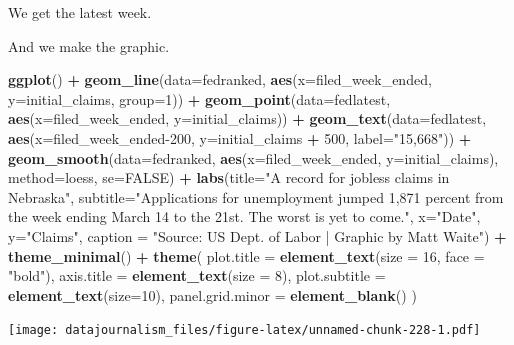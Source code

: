 \documentclass[]{book}
\newenvironment{Shaded}{\begin{snugshade}}{\end{snugshade}}
\newcommand{\DataTypeTok}[1]{\textcolor[rgb]{0.13,0.29,0.53}{#1}}
\newcommand{\DecValTok}[1]{\textcolor[rgb]{0.00,0.00,0.81}{#1}}
\newcommand{\KeywordTok}[1]{\textcolor[rgb]{0.13,0.29,0.53}{\textbf{#1}}}
\newcommand{\NormalTok}[1]{#1}
\newcommand{\OperatorTok}[1]{\textcolor[rgb]{0.81,0.36,0.00}{\textbf{#1}}}
\newcommand{\OtherTok}[1]{\textcolor[rgb]{0.56,0.35,0.01}{#1}}
\newcommand{\StringTok}[1]{\textcolor[rgb]{0.31,0.60,0.02}{#1}}
\begin{document}
We get the latest week.

\begin{Shaded}
\end{Shaded}

And we make the graphic.

\begin{Shaded}
\begin{Highlighting}[]
\KeywordTok{ggplot}\NormalTok{() }\OperatorTok{+}\StringTok{ }
\StringTok{  }\KeywordTok{geom_line}\NormalTok{(}\DataTypeTok{data=}\NormalTok{fedranked, }\KeywordTok{aes}\NormalTok{(}\DataTypeTok{x=}\NormalTok{filed_week_ended, }\DataTypeTok{y=}\NormalTok{initial_claims, }\DataTypeTok{group=}\DecValTok{1}\NormalTok{)) }\OperatorTok{+}
\StringTok{  }\KeywordTok{geom_point}\NormalTok{(}\DataTypeTok{data=}\NormalTok{fedlatest, }\KeywordTok{aes}\NormalTok{(}\DataTypeTok{x=}\NormalTok{filed_week_ended, }\DataTypeTok{y=}\NormalTok{initial_claims)) }\OperatorTok{+}\StringTok{ }
\StringTok{  }\KeywordTok{geom_text}\NormalTok{(}\DataTypeTok{data=}\NormalTok{fedlatest, }\KeywordTok{aes}\NormalTok{(}\DataTypeTok{x=}\NormalTok{filed_week_ended}\DecValTok{-200}\NormalTok{, }\DataTypeTok{y=}\NormalTok{initial_claims }\OperatorTok{+}\StringTok{ }\DecValTok{500}\NormalTok{, }\DataTypeTok{label=}\StringTok{"15,668"}\NormalTok{)) }\OperatorTok{+}\StringTok{ }
\StringTok{  }\KeywordTok{geom_smooth}\NormalTok{(}\DataTypeTok{data=}\NormalTok{fedranked, }\KeywordTok{aes}\NormalTok{(}\DataTypeTok{x=}\NormalTok{filed_week_ended, }\DataTypeTok{y=}\NormalTok{initial_claims), }\DataTypeTok{method=}\NormalTok{loess, }\DataTypeTok{se=}\OtherTok{FALSE}\NormalTok{) }\OperatorTok{+}\StringTok{ }
\StringTok{  }\KeywordTok{labs}\NormalTok{(}\DataTypeTok{title=}\StringTok{"A record for jobless claims in Nebraska"}\NormalTok{, }\DataTypeTok{subtitle=}\StringTok{"Applications for unemployment jumped 1,871 percent from the week ending March 14 to the 21st. The worst is yet to come."}\NormalTok{, }\DataTypeTok{x=}\StringTok{"Date"}\NormalTok{, }\DataTypeTok{y=}\StringTok{"Claims"}\NormalTok{, }\DataTypeTok{caption =} \StringTok{"Source: US Dept. of Labor  |  Graphic by Matt Waite"}\NormalTok{) }\OperatorTok{+}
\StringTok{  }\KeywordTok{theme_minimal}\NormalTok{() }\OperatorTok{+}\StringTok{ }
\StringTok{  }\KeywordTok{theme}\NormalTok{(}
    \DataTypeTok{plot.title =} \KeywordTok{element_text}\NormalTok{(}\DataTypeTok{size =} \DecValTok{16}\NormalTok{, }\DataTypeTok{face =} \StringTok{"bold"}\NormalTok{),}
    \DataTypeTok{axis.title =} \KeywordTok{element_text}\NormalTok{(}\DataTypeTok{size =} \DecValTok{8}\NormalTok{), }
    \DataTypeTok{plot.subtitle =} \KeywordTok{element_text}\NormalTok{(}\DataTypeTok{size=}\DecValTok{10}\NormalTok{), }
    \DataTypeTok{panel.grid.minor =} \KeywordTok{element_blank}\NormalTok{()}
\NormalTok{    )}
\end{Highlighting}
\end{Shaded}

\texttt{[image: datajournalism\_files/figure-latex/unnamed-chunk-228-1.pdf]}
\end{document}
